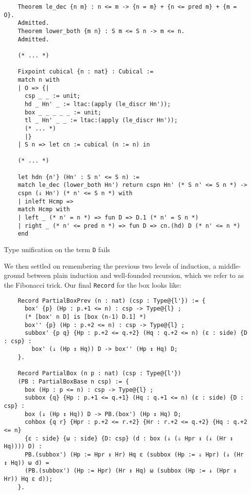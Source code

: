 \documentclass[10pt]{amsart}
\theoremstyle{definition}
\numberwithin{definition}{subsection}
\numberwithin{definition}{section}
\begin{document}
\begin{listing}[H]
  \begin{verbatim}
    Theorem le_dec {n m} : n <= m -> {n = m} + {n <= pred m} + {m = O}.
    Admitted.
    Theorem lower_both {m n} : S m <= S n -> m <= n.
    Admitted.

    (* ... *)

    Fixpoint cubical {n : nat} : Cubical :=
    match n with
    | O => {|
      csp _ _ := unit;
      hd _ Hn' _ := ltac:(apply (le_discr Hn'));
      box _ _ _ _ _ := unit;
      tl _ Hn' _ _ := ltac:(apply (le_discr Hn'));
      (* ... *)
      |}
    | S n => let cn := cubical (n := n) in

    (* ... *)

    let hdn {n'} (Hn' : S n' <= S n) :=
    match le_dec (lower_both Hn') return cspn Hn' (* S n' <= S n *) ->
    cspn (⇓ Hn') (* n' <= S n *) with
    | inleft Hcmp =>
    match Hcmp with
    | left _ (* n' = n *) => fun D => D.1 (* n' = S n *)
    | right _ (* n' <= pred n *) => fun D => cn.(hd) D (* n' <= n *)
    end
    \end{verbatim}
  \caption{Type unification on the term \texttt{D} fails}
\end{listing}

We then settled on remembering the previous two levels of induction, a middle-ground between plain induction and well-founded recursion, which we refer to as the Fibonacci trick. Our final \texttt{Record} for the box looks like:

\begin{listing}[H]
  \begin{verbatim}
    Record PartialBoxPrev (n : nat) (csp : Type@{l'}) := {
      box' {p} (Hp : p.+1 <= n) : csp -> Type@{l} ;
      (* [box' n D] is [box (n-1) D.1] *)
      box'' {p} (Hp : p.+2 <= n) : csp -> Type@{l} ;
      subbox' {p q} {Hp : p.+2 <= q.+2} (Hq : q.+2 <= n) (ε : side) {D : csp} :
        box' (↓ (Hp ↕ Hq)) D -> box'' (Hp ↕ Hq) D;
    }.

    Record PartialBox (n p : nat) (csp : Type@{l'})
    (PB : PartialBoxBase n csp) := {
      box (Hp : p <= n) : csp -> Type@{l} ;
      subbox {q} {Hp : p.+1 <= q.+1} (Hq : q.+1 <= n) (ε : side) {D : csp} :
      box (↓ (Hp ↕ Hq)) D -> PB.(box') (Hp ↕ Hq) D;
      cohbox {q r} {Hpr : p.+2 <= r.+2} {Hr : r.+2 <= q.+2} {Hq : q.+2 <= n}
      {ε : side} {ω : side} {D: csp} (d : box (↓ (⇓ Hpr ↕ (↓ (Hr ↕ Hq)))) D) :
      PB.(subbox') (Hp := Hpr ↕ Hr) Hq ε (subbox (Hp := ⇓ Hpr) (↓ (Hr ↕ Hq)) ω d) =
      (PB.(subbox') (Hp := Hpr) (Hr ↕ Hq) ω (subbox (Hp := ↓ (Hpr ↕ Hr)) Hq ε d));
    }.
  \end{verbatim}
\end{listing}
\end{document}
